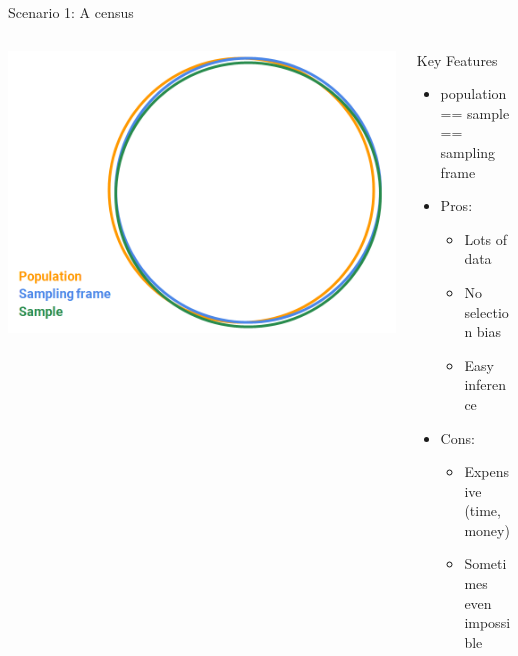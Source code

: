 \documentclass[aspectratio=169]{../latex_main/tntbeamer}  %
\begin{document}
	
	\begin{frame}{Scenario 1: A census}
	    \begin{columns}
	        \begin{column}{.4\textwidth}
	        
	               \includegraphics[scale=.3]{Bild3}
	               
	        \end{column}
	        
	        \begin{column}{.4\textwidth}
	            Key Features
                \begin{itemize}
                    \item population == sample\\ == sampling frame
                    \item Pros:
                    \begin{itemize}
                        \item Lots of data
                        \item No selection bias
                        \item Easy inference
                    \end{itemize}
                    \item Cons:
                    \begin{itemize}
                        \item Expensive (time, money)
                        \item Sometimes even impossible
                    \end{itemize}
                \end{itemize}
	        \end{column}
	        
	    \end{columns}
	    
	\end{frame}
	
\end{document}
